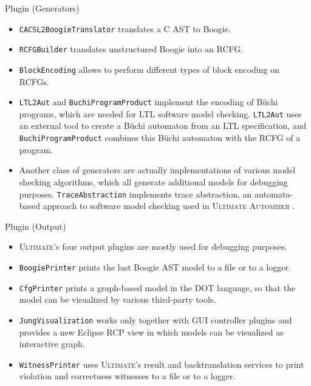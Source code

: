 \documentclass[12pt]{beamer}
\newcommand{\code}[1]{\texttt{#1}}
\newcommand{\ultimate}{\textsc{Ultimate }}
\newcommand{\ultimates}{\textsc{Ultimate}'s }
\newcommand{\automizer}{\textsc{Automizer }}
\begin{document}
\begin{frame}{Plugin (Generators)}
	\begin{itemize}
		\item \code{CACSL2BoogieTranslator} translates a C AST to Boogie.
		\item \code{RCFGBuilder} translates unstructured Boogie into an RCFG.
		\item \code{BlockEncoding} allows to perform different types of block encoding on RCFGs.
		\item \code{LTL2Aut} and \code{BuchiProgramProduct} implement the encoding of Büchi programs, which are needed for LTL software model checking. \code{LTL2Aut} uses an external tool to create a Büchi automaton from an LTL specification, and \code{BuchiProgramProduct} combines this Büchi automaton with the RCFG of a program.
		\item Another class of generators are actually implementations of various model checking algorithms, which all generate additional models for debugging purposes. \code{TraceAbstraction} implements trace abstraction, an automata-based approach to software model checking used in \ultimate \automizer.
	\end{itemize}
\end{frame}

\begin{frame}{Plugin (Output)}
	\begin{itemize}
		\item \ultimates four output plugins are mostly used for debugging purposes.
		\item \code{BoogiePrinter} prints the last Boogie AST model to a file or to a logger.
		\item \code{CfgPrinter} prints a graph-based model in the DOT language, so that the model can be visualized by various third-party tools.
		\item \code{JungVisualization} works only together with GUI controller plugins and provides a new Eclipse RCP view in which models can be visualized as interactive graph. 
		\item \code{WitnessPrinter} uses \ultimates result and backtranslation services to print violation and correctness witnesses to a file or to a logger.
	\end{itemize}
\end{frame}
\end{document}
